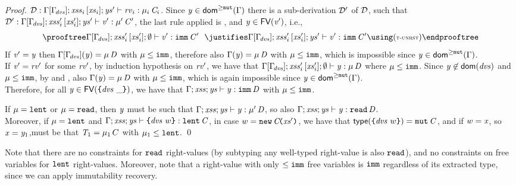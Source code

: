 {\begin{proof}
${\cal D}:{\Gamma[\Gamma_{\!\mathit{dvs}}]};{\mathit{xss}_i}\,[\mathit{xs}_i];\mathit{ys}'\vdash \mathit{rv}_i:\mu_i\,\mathit{C}_i$. Since $\mathit{y}\in{\textsf{dom}^{\geq\texttt{mut}}}(\Gamma)$ there is a sub-derivation ${\cal D}'$ of ${\cal D}$, such that
${\cal D}':{\Gamma[\Gamma_{\!\mathit{dvs}}]};{\mathit{xss}'_i}\,[\mathit{xs}'_i];\mathit{ys}'\vdash \mathit{v}':\mu'\,\mathit{C}'$, the last  rule applied is , and $\mathit{y}\in\textsf{FV}(\mathit{v}')$, i.e.,
\[
\prooftree
\AuxTypeCheck{{\SubstFun{\Gamma}{\TypeEnv{\dvs}}}}{{\LentLocked'_i}}{\MutGroup'_i}{\emptyset}{\val'}{\Type{\imm}{\C'}}\ \ 
\justifies
\AuxTypeCheck{{\SubstFun{\Gamma}{\TypeEnv{\dvs}}}}{{\LentLocked'_i}}{\MutGroup'_i}{\StronglyLocked'}{\val'}{\Type{\imm}{\C'}}
\using
\rn{t-unrst}
\endprooftree
\] 
If $\mathit{v}'=\mathit{y}$ then $\Gamma[\Gamma_{\!\mathit{dvs}}](\mathit{y})=\mu\,\mathit{D}$ with $\mu\leq\texttt{imm}$, therefore also $\Gamma(\mathit{y})=\mu\,\mathit{D}$ with $\mu\leq\texttt{imm}$, which is impossible since $\mathit{y}\in{\textsf{dom}^{\geq\texttt{mut}}}(\Gamma)$. \\
If $\mathit{v}'=\mathit{rv}'$ for some $\mathit{rv}'$, by induction hypothesis
on $\mathit{rv}'$, we have that ${\Gamma[\Gamma_{\!\mathit{dvs}}]};{\mathit{xss}'_i}\,[\mathit{xs}'_i];\emptyset\vdash \mathit{y}:\mu\,\mathit{D}$ where $\mu\leq\texttt{imm}$. Since $\mathit{y}\not\in\textsf{dom}(\mathit{dvs})$ and $\mu\leq\texttt{imm}$, by  and , also $\Gamma(\mathit{y})=\mu\,\mathit{D}$ with $\mu\leq\texttt{imm}$, which is again impossible since $\mathit{y}\in{\textsf{dom}^{\geq\texttt{mut}}}(\Gamma)$. \\
Therefore, for all $\mathit{y}\in\textsf{FV}(\texttt{\{}\mathit{dvs}\ \_\texttt{\}})$, we have that 
$\Gamma;\mathit{xss};\mathit{ys}\vdash \mathit{y}:\texttt{imm}\,\mathit{D}$ with $\mu\leq \texttt{imm}$. 

\medskip\noindent
If \underline{$\mu=\texttt{lent}$} or \underline{$\mu=\texttt{read}$}, then $\mathit{y}$ must be such that
$\Gamma;\mathit{xss};\mathit{ys}\vdash \mathit{y}:\mu'\,\mathit{D}$, so also
$\Gamma;\mathit{xss};\mathit{ys}\vdash \mathit{y}:\texttt{read}\,\mathit{D}$.\\
Moreover, if \underline{$\mu=\texttt{lent}$} and $\Gamma;\mathit{xss};\mathit{ys}\vdash \texttt{\{}\mathit{dvs}\ w\texttt{\}}:\texttt{lent}\,\mathit{C}$, in case $w=\texttt{new}\,\mathit{C}\!\texttt{(}\mathit{xs}'\texttt{)}$, we have that 
$\textsf{type}(\texttt{\{}\mathit{dvs}\ w\texttt{\}})=\texttt{mut}\,\mathit{C}$, and if $w=\mathit{x}$, so $\mathit{x}=\mathit{y}_1$,must
be that $\mathit{T}_1=\mu_1\,C$ with $\mu_1\leq\texttt{lent}$.
\qed
\end{proof}
Note that there are no constraints for $\texttt{read}$ right-values (by subtyping any well-typed right-value is also $\texttt{read}$), and no constraints on free variables for $\texttt{lent}$ right-values.  
Moreover, note that a right-value with only $\leq\texttt{imm}$ free variables is $\texttt{imm}$ regardless of its extracted type, since we can apply  {immutability recovery}.


}

